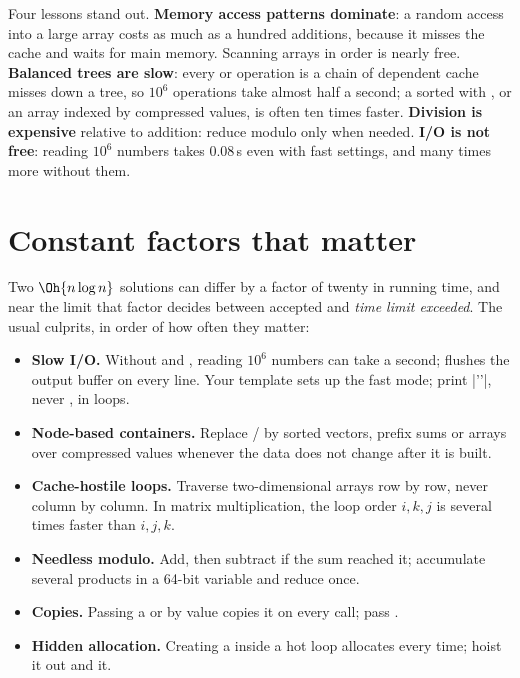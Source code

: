 Four lessons stand out. \textbf{Memory access patterns dominate}: a random access into a large array costs as much as a
hundred additions, because it misses the cache and waits for main memory. Scanning arrays in order is nearly free.
\textbf{Balanced trees are slow}: every  or  operation is a chain of dependent cache misses down a tree, so
$10^6$ operations take almost half a second; a sorted  with , or an array indexed by compressed
values, is often ten times faster. \textbf{Division is expensive} relative to addition: reduce modulo only when needed.
\textbf{I/O is not free}: reading $10^6$ numbers takes 0.08\,s even with fast settings, and many times more without them.

\section[Constant factors that matter]{Constant factors that matter \hfill \gold}\label{sec:constants}

Two $\Oh{n \log n}$ solutions can differ by a factor of twenty in running time, and near the limit that factor decides
between accepted and \emph{time limit exceeded}. The usual culprits, in order of how often they matter:

\begin{itemize}
  \item \textbf{Slow I/O.} Without  and , reading $10^6$ numbers can
        take a second;  flushes the output buffer on every line. Your template sets up the fast mode; print
        \cc|'\n'|, never , in loops.
  \item \textbf{Node-based containers.} Replace / by sorted vectors, prefix sums or arrays over
        compressed values whenever the data does not change after it is built.
  \item \textbf{Cache-hostile loops.} Traverse two-dimensional arrays row by row, never column by column. In matrix
        multiplication, the loop order $i, k, j$ is several times faster than $i, j, k$.
  \item \textbf{Needless modulo.} Add, then subtract  if the sum reached it; accumulate several products in a
        64-bit variable and reduce once.
  \item \textbf{Copies.} Passing a  or  by value copies it on every call; pass .
  \item \textbf{Hidden allocation.} Creating a  inside a hot loop allocates every time; hoist it out and
         it.
\end{itemize}

